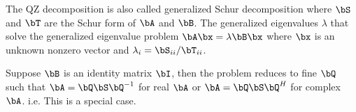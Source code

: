 The QZ decomposition is also called generalized Schur decomposition
where $\bS$ and $\bT$ are the Schur form of $\bA$ and $\bB$.
The generalized eigenvalues $\lambda$ that solve the generalized eigenvalue
problem $\bA \bx = \lambda \bB \bx$ where $\bx$ is an unknown nonzero vector
and $\lambda_i = \bS_{ii} / \bT_{ii}$.

Suppose $\bB$ is an identity matrix $\bI$, then the problem reduces to
fine $\bQ$ such that $\bA = \bQ\bS\bQ^{-1}$ for real $\bA$ or
$\bA = \bQ\bS\bQ^{H}$ for complex $\bA$.
i.e. This is a special case.


